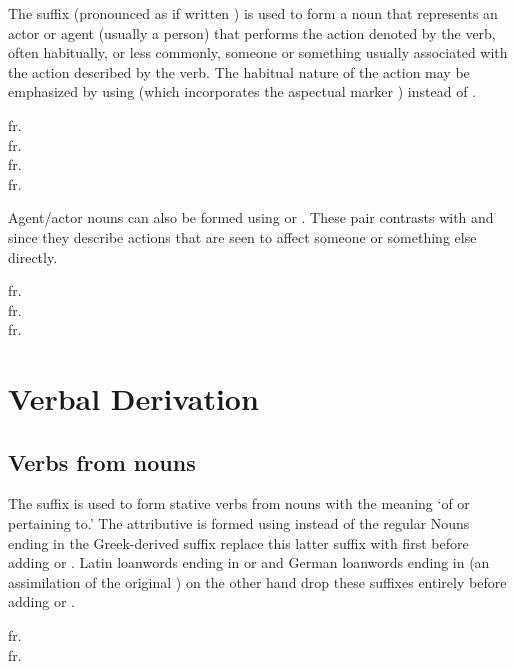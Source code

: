 The suffix  (pronounced as if written ) is used to form a noun that represents an actor or agent (usually a person) that performs the action denoted by the verb, often habitually, or less commonly, someone or something usually associated with the action described by the verb. The habitual nature of the action may be emphasized by using  (which incorporates the aspectual marker ) instead of . 

\ex
{} fr. \\
 fr. \\
 fr. \\
 fr. \\
\xe

Agent/actor nouns can also be formed using  or . These pair contrasts with  and  since they describe actions that are seen to affect someone or something else directly.

\ex
{} fr. \\
 fr. \\
 fr. 
\xe

\section{Verbal Derivation}

\subsection{Verbs from nouns}

The suffix  is used to form stative verbs from nouns with the meaning `of or pertaining to.' The attributive is formed using  instead of the regular  Nouns ending in the Greek-derived suffix  replace this latter suffix with  first before adding  or . Latin loanwords ending in  or  and German loanwords ending in  (an assimilation of the original ) on the other hand drop these suffixes entirely before adding  or .

\ex
{} fr. \\
 fr. \\
\xe

